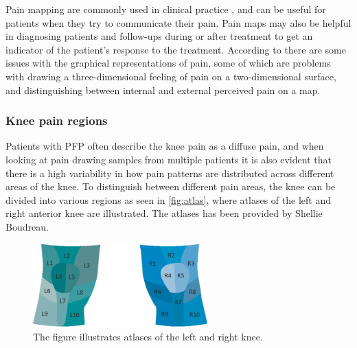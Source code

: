 Pain mapping are commonly used in clinical practice \citep{Schott2010}, and can be useful for patients when they try to communicate their pain. Pain maps may also be helpful in diagnosing patients and follow-ups during or after treatment to get an indicator of the patient’s response to the treatment.\citep{Boudreau2016}
According to \citeauthor{Schott2010} there are some issues with the graphical representations of pain, some of which are problems with drawing a three-dimensional feeling of pain on a two-dimensional surface, and distinguishing between internal and external perceived pain on a map.\citep{Schott2010}

\subsubsection{Knee pain regions}
Patients with PFP often describe the knee pain as a diffuse pain, and when looking at pain drawing samples from multiple patients it is also evident that there is a high variability in how pain patterns are distributed across different areas of the knee. 
To distinguish between different pain areas, the knee can be divided into various regions as seen in \autoref{fig:atlas}, where atlases of the left and right anterior knee are illustrated. The atlases has been provided by Shellie Boudreau. 

\begin{figure} [H]
\centering
\includegraphics[width=0.6\textwidth]{figures/atlas}
\caption{The figure illustrates atlases of the left and right knee.}
\label{fig:atlas}
\end{figure}

